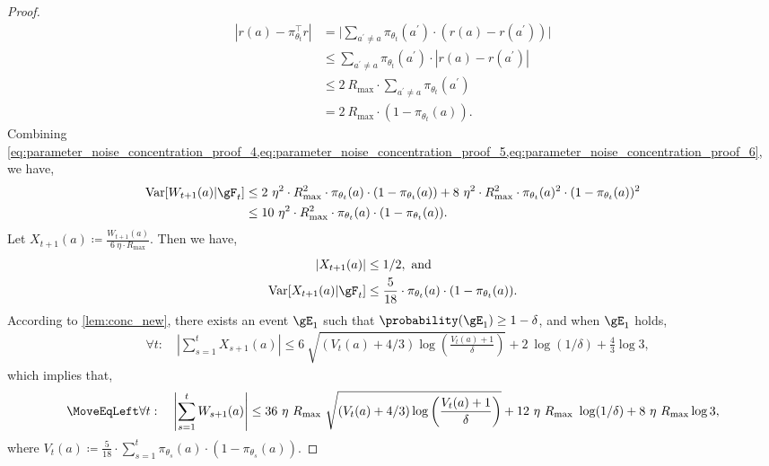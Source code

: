 \begin{proof}
\begin{align}
    \left| r(a) - \pi_{\theta_t}^\top r  \right|  
    &= \bigg| \sum_{a^\prime \ne a} \pi_{\theta_t}(a^\prime) \cdot \left( r(a)-r(a^\prime) \right) \bigg| \\ 
    &\le \sum_{a^\prime \ne a} \pi_{\theta_t}(a^\prime) \cdot \left|  r(a)-r(a^\prime)  \right| 
    \\
    &\le 2 \ R_{\max} \cdot \sum_{a^\prime \ne a} \pi_{\theta_t}(a^\prime) \\
    &= 2 \ R_{\max} \cdot \left( 1-\pi_{\theta_t}(a) \right).
\end{align}
Combining \cref{eq:parameter_noise_concentration_proof_4,eq:parameter_noise_concentration_proof_5,eq:parameter_noise_concentration_proof_6}, we have,
\begin{align}
\label{eq:parameter_noise_concentration_proof_7}
    \mathrm{Var}[ W_{t+1}(a) | \gF_t ]
    &\le 2 \ \eta^2 \cdot R_{\max}^2 \cdot \pi_{\theta_t}(a) \cdot (1-\pi_{\theta_t}(a)) + 8 \ \eta^2 \cdot R_{\max}^2 \cdot \pi_{\theta_t}(a)^2 \cdot ( 1-\pi_{\theta_t}(a) )^2 \\
    &\le 10 \ \eta^2 \cdot R_{\max}^2 \cdot \pi_{\theta_t}(a) \cdot (1-\pi_{\theta_t}(a)).
\end{align}
Let $X_{t+1}(a) \coloneqq \frac{ W_{t+1}(a) }{  6 \ \eta \cdot R_{\max} }$. Then we have, 
\begin{align}
\label{eq:parameter_noise_concentration_proof_8a}
    |X_{t+1}(a)| &\le 1/2, \text{ and} \\
\label{eq:parameter_noise_concentration_proof_8b}
    \mathrm{Var}[ X_{t+1}(a) | \gF_t ] &\le \frac{5}{18} \cdot \pi_{\theta_t}(a) \cdot (1-\pi_{\theta_t}(a)).
\end{align}
According to \cref{lem:conc_new}, there exists an event $\gE_1 $ such that $\probability(\gE_1 ) \ge 1- \delta$, and when $\gE_1 $ holds, 
\begin{align}
\label{eq:parameter_noise_concentration_proof_9}
    &\forall t: \quad \left| \sum_{s=1}^t X_{s+1}(a) \right| \le  6 \ \sqrt{  (V_t(a)+4/3)\log \left( \frac{ V_t(a)+1  }{ \delta } \right) } + 2 \ \log(1/\delta)   + \frac{4}{3} \log 3,
\end{align}
which implies that, 
\begin{align}
\label{eq:parameter_noise_concentration_proof_10}
\MoveEqLeft
    \forall t:\quad \left| \sum_{s=1}^t W_{s+1}(a) \right| \le  36 \ \eta \ R_{\max} \ \sqrt{  (V_t(a)+4/3)\log \left( \frac{  V_t(a)+1  }{ \delta } \right) } + 12 \ \eta \ R_{\max} \ \log(1/\delta) +  8 \ \eta \ R_{\max}\log 3,
\end{align}
where $V_t(a) \coloneqq \frac{5}{18} \cdot \sum_{s=1}^t  \pi_{\theta_s}(a)\cdot (1-\pi_{\theta_s}(a))$.
\end{proof}

